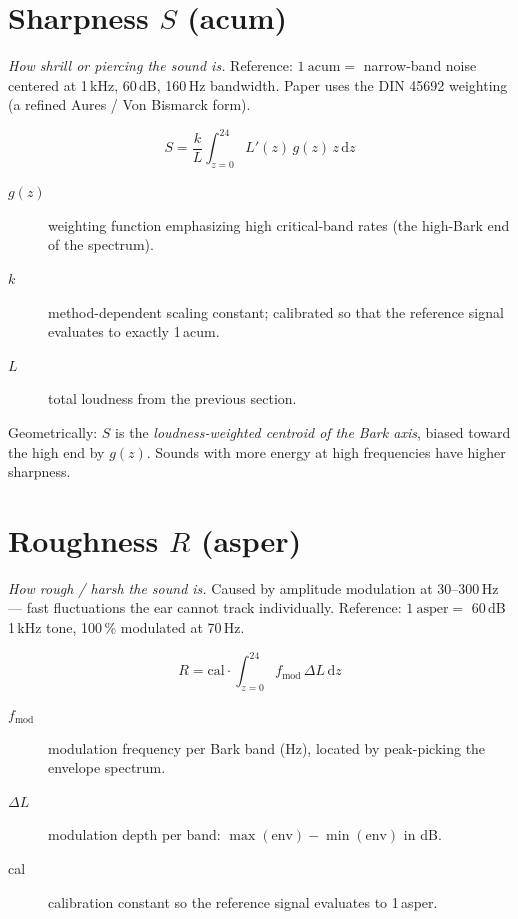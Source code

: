 \documentclass[11pt,a4paper]{article}
\begin{document}
\section{Sharpness \texorpdfstring{$S$}{S} (acum)}

\textit{How shrill or piercing the sound is.} Reference: $1\ \text{acum} = $ narrow-band
noise centered at 1\,kHz, 60\,dB, 160\,Hz bandwidth. Paper uses the DIN 45692 weighting
(a refined Aures / Von Bismarck form).

\[
  S = \frac{k}{L} \int_{z=0}^{24} L'(z)\, g(z)\, z\, \mathrm{d}z
\]

\begin{description}
  \item[$g(z)$] weighting function emphasizing high critical-band rates
                (the high-Bark end of the spectrum).
  \item[$k$]    method-dependent scaling constant; calibrated so that the
                reference signal evaluates to exactly 1\,acum.
  \item[$L$]    total loudness from the previous section.
\end{description}

\noindent
Geometrically: $S$ is the \emph{loudness-weighted centroid of the Bark axis}, biased
toward the high end by $g(z)$. Sounds with more energy at high frequencies have higher
sharpness.

\section{Roughness \texorpdfstring{$R$}{R} (asper)}

\textit{How rough / harsh the sound is.} Caused by amplitude modulation at
$30$--$300$\,Hz --- fast fluctuations the ear cannot track individually. Reference:
$1\ \text{asper} = $ 60\,dB 1\,kHz tone, 100\,\% modulated at 70\,Hz.

\[
  R = \mathrm{cal} \cdot \int_{z=0}^{24} f_{\text{mod}}\, \Delta L\, \mathrm{d}z
\]

\begin{description}
  \item[$f_{\text{mod}}$] modulation frequency per Bark band (Hz), located by
                          peak-picking the envelope spectrum.
  \item[$\Delta L$]       modulation depth per band: $\max(\text{env}) - \min(\text{env})$ in dB.
  \item[cal]              calibration constant so the reference signal evaluates to 1\,asper.
\end{description}
\end{document}
